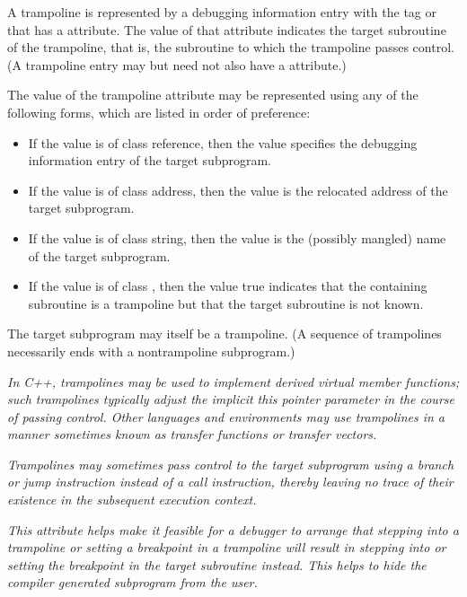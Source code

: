 A trampoline is represented by a debugging information entry
with the tag  or 
that has a  attribute. The value of that
attribute indicates the target subroutine of the trampoline,
that is, the subroutine to which the trampoline passes
control. (A trampoline entry may but need not also have a
 attribute.)

The value of the trampoline attribute may be represented
using any of the following forms, which are listed in order
of preference:

\begin{itemize}
\item If the value is of class reference, then the value
specifies the debugging information entry of the target
subprogram.

\item If the value is of class address, then the value is
the relocated address of the target subprogram.

\item If the value is of class string, then the value is the
(possibly mangled) name of the target subprogram.

\item If the value is of class , then the value true
indicates that the containing subroutine is a trampoline but
that the target subroutine is not known.
\end{itemize}


The target subprogram may itself be a trampoline. (A sequence
of trampolines necessarily ends with a non\dash trampoline
subprogram.)

\textit{In C++, trampolines may be used to implement derived virtual
member functions; such trampolines typically adjust the
implicit this pointer parameter in the course of passing
control.  Other languages and environments may use trampolines
in a manner sometimes known as transfer functions or transfer
vectors.}

\textit{Trampolines may sometimes pass control to the target
subprogram using a branch or jump instruction instead of a
call instruction, thereby leaving no trace of their existence
in the subsequent execution context. }

\textit{This attribute helps make it feasible for a debugger to arrange
that stepping into a trampoline or setting a breakpoint in
a trampoline will result in stepping into or setting the
breakpoint in the target subroutine instead. This helps to
hide the compiler generated subprogram from the user. }

